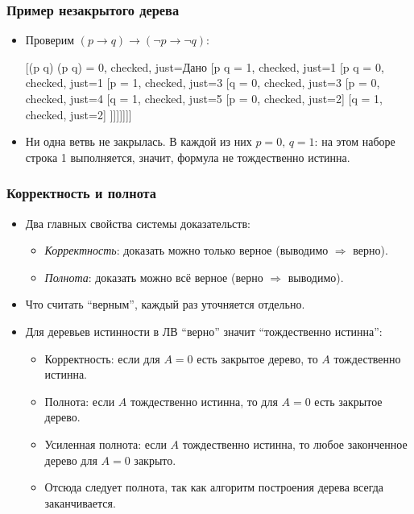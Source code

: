 \documentclass[10pt]{beamer}
\begin{document}
\begin{frame}
\frametitle{Пример незакрытого дерева}
\begin{itemize}
    \item Проверим $(p \to q) \to (\neg p \to \neg q)$:
    \begin{tableau}{}
        [{(p \to q) \to (\neg p \to \neg q) = 0}, checked, just=Дано
        [{p \to q = 1}, checked, just=1
        [{\neg p \to \neg q = 0}, checked, just=1
        [{\neg p = 1}, checked, just=3
        [{\neg q = 0}, checked, just=3
        [{p = 0}, checked, just=4
        [{q = 1}, checked, just=5
        [{p = 0}, checked, just=2] [{q = 1}, checked, just=2]
        ]]]]]]]
    \end{tableau}
    \item Ни одна ветвь не закрылась. В каждой из них $p=0,\,q=1$: на этом наборе строка 1 выполняется, значит, \pause формула не тождественно истинна.
\end{itemize}
\end{frame}

\begin{frame}
    \frametitle{Корректность и полнота}
    \begin{itemize}
        \item Два главных свойства системы доказательств:
        \begin{itemize}
            \item \emph{Корректность}: доказать можно только верное (выводимо $\Rightarrow$ верно).
            \item \emph{Полнота}: доказать можно всё верное (верно $\Rightarrow$ выводимо).
        \end{itemize}
        \item Что считать \enquote{верным}, каждый раз уточняется отдельно.
        \pause
        \item Для деревьев истинности в ЛВ \enquote{верно} значит \enquote{тождественно истинна}:
        \begin{itemize}
            \item Корректность: если для $A=0$ есть закрытое дерево, то $A$ тождественно истинна.
            \item Полнота: если $A$ тождественно истинна, то для $A=0$ есть закрытое дерево.
            \pause
            \item Усиленная полнота: если $A$ тождественно истинна, то любое законченное дерево для $A=0$ закрыто.
            \item Отсюда следует полнота, так как алгоритм построения дерева всегда заканчивается.
        \end{itemize}
    \end{itemize}
\end{frame}
\end{document}

